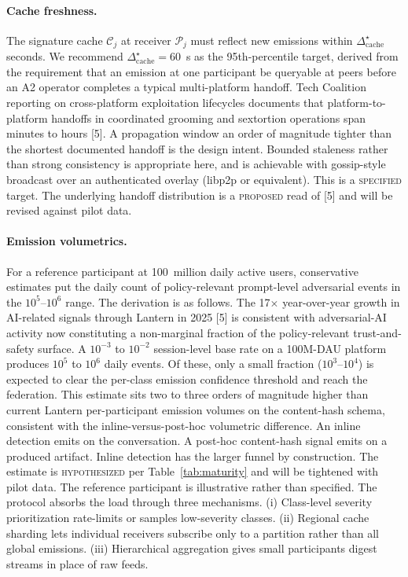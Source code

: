 \documentclass[11pt]{article}
\begin{document}
\paragraph{Cache freshness.} The signature cache $\mathcal{C}_j$ at receiver $\mathcal{P}_j$ must reflect new emissions within $\Delta_\mathrm{cache}^\star$ seconds. We recommend $\Delta_\mathrm{cache}^\star = 60$~s as the 95th-percentile target, derived from the requirement that an emission at one participant be queryable at peers before an A2 operator completes a typical multi-platform handoff. Tech Coalition reporting on cross-platform exploitation lifecycles documents that platform-to-platform handoffs in coordinated grooming and sextortion operations span minutes to hours [5]. A propagation window an order of magnitude tighter than the shortest documented handoff is the design intent. Bounded staleness rather than strong consistency is appropriate here, and is achievable with gossip-style broadcast over an authenticated overlay (libp2p or equivalent). This is a \textsc{specified} target. The underlying handoff distribution is a \textsc{proposed} read of [5] and will be revised against pilot data.

\paragraph{Emission volumetrics.} For a reference participant at 100~million daily active users, conservative estimates put the daily count of policy-relevant prompt-level adversarial events in the $10^5$--$10^6$ range. The derivation is as follows. The 17$\times$ year-over-year growth in AI-related signals through Lantern in 2025 [5] is consistent with adversarial-AI activity now constituting a non-marginal fraction of the policy-relevant trust-and-safety surface. A $10^{-3}$ to $10^{-2}$ session-level base rate on a 100M-DAU platform produces $10^5$ to $10^6$ daily events. Of these, only a small fraction ($10^3$--$10^4$) is expected to clear the per-class emission confidence threshold and reach the federation. This estimate sits two to three orders of magnitude higher than current Lantern per-participant emission volumes on the content-hash schema, consistent with the inline-versus-post-hoc volumetric difference. An inline detection emits on the conversation. A post-hoc content-hash signal emits on a produced artifact. Inline detection has the larger funnel by construction. The estimate is \textsc{hypothesized} per Table~\ref{tab:maturity} and will be tightened with pilot data. The reference participant is illustrative rather than specified. The protocol absorbs the load through three mechanisms. (i) Class-level severity prioritization rate-limits or samples low-severity classes. (ii) Regional cache sharding lets individual receivers subscribe only to a partition rather than all global emissions. (iii) Hierarchical aggregation gives small participants digest streams in place of raw feeds.
\end{document}
